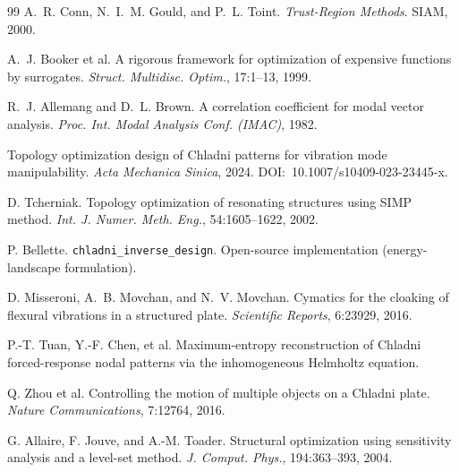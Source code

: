 \documentclass[11pt,a4paper]{article}
\begin{document}
\begin{thebibliography}{99}
 A.~R. Conn, N.~I.~M. Gould, and P.~L. Toint.
\textit{Trust-Region Methods}. SIAM, 2000.

 A.~J. Booker et al. A rigorous framework for optimization of
expensive functions by surrogates. \textit{Struct. Multidisc. Optim.}, 17:1--13,
1999.

 R.~J. Allemang and D.~L. Brown. A correlation coefficient
for modal vector analysis. \textit{Proc. Int. Modal Analysis Conf. (IMAC)}, 1982.

 Topology optimization design of Chladni patterns for vibration
mode manipulability. \textit{Acta Mechanica Sinica}, 2024.
DOI:~10.1007/s10409-023-23445-x.

 D. Tcherniak. Topology optimization of resonating
structures using SIMP method. \textit{Int. J. Numer. Meth. Eng.}, 54:1605--1622,
2002.

 P. Bellette. \texttt{chladni\_inverse\_design}. Open-source
implementation (energy-landscape formulation).

 D. Misseroni, A.~B. Movchan, and N.~V. Movchan. Cymatics
for the cloaking of flexural vibrations in a structured plate. \textit{Scientific
Reports}, 6:23929, 2016.

 P.-T. Tuan, Y.-F. Chen, et al. Maximum-entropy reconstruction
of Chladni forced-response nodal patterns via the inhomogeneous Helmholtz
equation.

 Q. Zhou et al. Controlling the motion of multiple objects on a
Chladni plate. \textit{Nature Communications}, 7:12764, 2016.

 G. Allaire, F. Jouve, and A.-M. Toader. Structural
optimization using sensitivity analysis and a level-set method. \textit{J.
Comput. Phys.}, 194:363--393, 2004.

\end{thebibliography}
\end{document}
